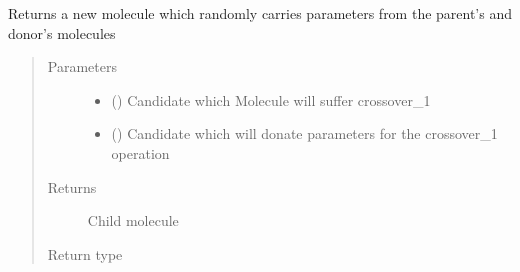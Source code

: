\documentclass[letterpaper,10pt,english]{sphinxmanual}
\begin{document}
\begin{fulllineitems}
\begin{fulllineitems}
\end{fulllineitems}


\begin{fulllineitems}
\label{\detokenize{MolOpt:MolOpt.MolOpt.MolOpt.crossover_n}}
\sphinxAtStartPar
Returns a new molecule which randomly carries parameters from the parent’s and donor’s molecules
\begin{quote}\begin{description}
\item[{Parameters}] \leavevmode\begin{itemize}
\item {} 
\sphinxAtStartPar
{} ({\hyperref[\detokenize{MolOpt.genetic:MolOpt.genetic.genetic.Chromosome}]{}}) \textendash{} Candidate which Molecule will suffer crossover\_1

\item {} 
\sphinxAtStartPar
{} ({\hyperref[\detokenize{MolOpt.genetic:MolOpt.genetic.genetic.Chromosome}]{}}) \textendash{} Candidate which will donate parameters for the crossover\_1 operation

\end{itemize}

\item[{Returns}] \leavevmode
\sphinxAtStartPar
Child molecule

\item[{Return type}] \leavevmode
\sphinxAtStartPar
{\hyperref[\detokenize{MolOpt.molecular:MolOpt.molecular.molecular.Molecule}]{}}

\end{description}\end{quote}


\end{fulllineitems}
\end{fulllineitems}
\end{document}
